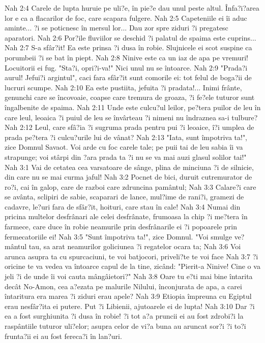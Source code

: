 Nah 2:4  Carele de lupta huruie pe uli?e, în pie?e dau unul peste altul. Înfa?i?area lor e ca a flacarilor de foc, care scapara fulgere.
Nah 2:5  Capeteniile ei îi aduc aminte... ?i se poticnesc în mersul lor... Dau zor spre ziduri ?i pregatesc aparatori.
Nah 2:6  Por?ile fluviilor se deschid ?i palatul de spaima este cuprins...
Nah 2:7  S-a sfâr?it! Ea este prinsa ?i dusa în robie. Slujnicele ei scot suspine ca porumbeii ?i se bat în piept.
Nah 2:8  Ninive este ca un iaz de apa pe vremuri! Locuitorii ei fug. "Sta?i, opri?i-va!" Nici unul nu se întoarce.
Nah 2:9  "Prada?i aurul! Jefui?i argintul", caci fara sfâr?it sunt comorile ei: tot felul de boga?ii de lucruri scumpe.
Nah 2:10  Ea este pustiita, jefuita ?i pradata!... Inimi frânte, genunchi care se încovoaie, coapse care tremura de groaza, ?i fe?ele tuturor sunt îngalbenite de spaima.
Nah 2:11  Unde este culcu?ul leilor, pe?tera puilor de leu în care leul, leoaica ?i puiul de leu se învârteau ?i nimeni nu îndraznea sa-i tulbure?
Nah 2:12  Leul, care sfâ?ia ?i sugruma prada pentru pui ?i leoaice, î?i umplea de prada pe?tera ?i culcu?urile lui de vânat?
Nah 2:13  "Iata, sunt împotriva ta!", zice Domnul Savaot. Voi arde cu foc carele tale; pe puii tai de leu sabia îi va strapunge; voi stârpi din ?ara prada ta ?i nu se va mai auzi glasul solilor tai!"
Nah 3:1  Vai de cetatea cea varsatoare de sânge, plina de minciuna ?i de silnicie, din care nu se mai curma jaful!
Nah 3:2  Pocnet de bici, duruit cutremurator de ro?i, cai în galop, care de razboi care zdruncina pamântul;
Nah 3:3  Calare?i care se avânta, sclipiri de sabie, scaparari de lance, mul?ime de rani?i, gramezi de cadavre, le?uri fara de sfâr?it, hoituri, care stau în cale!
Nah 3:4  Numai din pricina multelor desfrânari ale celei desfrânate, frumoasa la chip ?i me?tera în farmece, care duce în robie neamurile prin desfrânarile ei ?i popoarele prin fermecatoriile ei!
Nah 3:5  "Sunt împotriva ta!", zice Domnul. "Voi smulge ve?mântul tau, sa arat neamurilor goliciunea ?i regatelor ocara ta;
Nah 3:6  Voi arunca asupra ta cu spurcaciuni, te voi batjocori, priveli?te te voi face
Nah 3:7  ?i oricine te va vedea va întoarce capul de la tine, zicând: "Pierit-a Ninive! Cine o va jeli ?i de unde îi voi cauta mângâietori?"
Nah 3:8  Oare tu e?ti mai bine întarita decât No-Amon, cea a?ezata pe malurile Nilului, înconjurata de apa, a carei întaritura era marea ?i ziduri erau apele?
Nah 3:9  Etiopia împreuna cu Egiptul erau nesfâr?ita ei putere. Put ?i Libienii, ajutoarele ei de lupta!
Nah 3:10  Dar ?i ea a fost surghiunita ?i dusa în robie! ?i tot a?a pruncii ei au fost zdrobi?i la raspântiile tuturor uli?elor; asupra celor de vi?a buna au aruncat sor?i ?i to?i frunta?ii ei au fost fereca?i în lan?uri.
